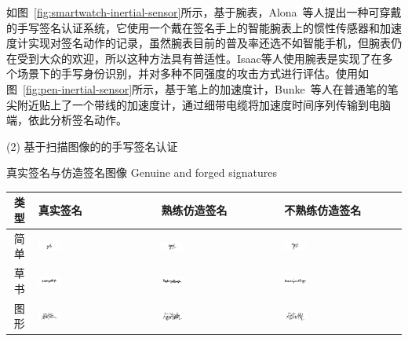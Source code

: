 如图~\ref{fig:smartwatch-inertial-sensor}所示，基于腕表，Alona~\cite{Levy2018Handwritten}等人提出一种可穿戴的手写签名认证系统，它使用一个戴在签名手上的智能腕表上的惯性传感器和加速度计实现对签名动作的记录，虽然腕表目前的普及率还选不如智能手机，但腕表仍在受到大众的欢迎，所以这种方法具有普适性。Isaac\cite{8698222}等人使用腕表是实现了在多个场景下的手写身份识别，并对多种不同强度的攻击方式进行评估。使用如图~\ref{fig:pen-inertial-sensor}所示，基于笔上的加速度计，Bunke~\cite{Bunke2015Online}等人在普通笔的笔尖附近贴上了一个带线的加速度计，通过细带电缆将加速度时间序列传输到电脑端，依此分析签名动作。

(2) 基于扫描图像的的手写签名认证
\begin{table}[!hpb]
  \centering
  \bicaption
    {真实签名与仿造签名图像}
    {Genuine and forged signatures}
  \label{tab:signatures-images}
  \begin{tabular}{|c|m{}|m{}|m{}|} \toprule 
    类型 & 真实签名 & 熟练仿造签名 & 不熟练仿造签名\\ \midrule
   简单& \includegraphics[width=0.2\textwidth]{figure/signature-1.png}&\includegraphics[width=0.2\textwidth]{figure/signature-2.png}&\includegraphics[width=0.2\textwidth]{figure/signature-3.png} \\ \midrule
    草书&\includegraphics[width=0.2\textwidth]{figure/signature-4.png}&\includegraphics[width=0.2\textwidth]{figure/signature-5.png}&\includegraphics[width=0.2\textwidth]{figure/signature-6.png} \\ \midrule
    图形&\includegraphics[width=0.2\textwidth]{figure/signature-7.png}&\includegraphics[width=0.2\textwidth]{figure/signature-8.png}&\includegraphics[width=0.2\textwidth]{figure/signature-9.png} \\ 

\end{tabular}
\end{table}
